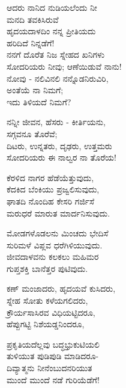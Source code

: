 \begin{myquote}
ಆದರು ನಾನಿದ ನುಡಿಯಲೆಂದು ನೀ\\ಮನದಿ ತವಕಿಸಿರುವೆ\\ಹೃದಯದಾಳದಿಂ ನನ್ನ ಪ್ರೀತಿಯದು\\ಹರಿದಿದೆ ನಿನ್ನಡೆಗೆ!\\ನನಗೆ ದೊರೆತ ನಿಜ ಸ್ನೇಹದ ಖನಿಗಳು\\ಸೋದರಿಯರು ನೀವು; ಆಣೆಯಿಡುವೆ ನಾನು!\\ನೋವು - ನಲಿವಿನಲಿ ನನ್ನೊಡನಿರುವಿರಿ,\\ಅಂತೆಯೆ ನಾ ನಿಮಗೆ;\\ಇದು ತಿಳಿಯದೆ ನಿಮಗೆ?
\end{myquote}

\begin{myquote}
ನನ್ನೀ ಜೀವನ, ಹೆಸರು - ಕೀರ್ತಿಯನು,\\ಸಗ್ಗವನೂ ತೊರೆವೆ;\\ದಿಟರು, ಉನ್ನತರು, ದೃಢರು, ಉತ್ತಮರು\\ಸೋದರಿಯರು ಈ ನಾಲ್ವರ ನಾ ತೊರೆಯ!
\end{myquote}

\begin{myquote}
ಕೆರಳಿದ ನಾಗರ ಹೆಡೆಯೆತ್ತುವುದು,\\ಕೆದಕಿದ ಬೆಂಕಿಯು ಪ್ರಜ್ವಲಿಸುವುದು,\\ಘಾತದಿ ನೊಂದಿಹ ಕೇಸರಿ ಗರ್ಜಿಸೆ\\ಮರುಧರೆ ಮಾರುತ ಮಾರ್ದನಿಸುವುದು.
\end{myquote}

\begin{myquote}
ಮೋಡಗಳೊಡಲನು ಮಿಂಚದು ಭೇದಿಸೆ\\ಸುರಿಮಳೆ ವಿಪ್ಲವ ಧರೆಗಿಳಿಯುವುದು.\\ಜೀವದಾಳವನು ಕಲಕಲು ಮಹಿಮರ\\ಗುಪ್ತಶಕ್ತಿ ಬಾನೆತ್ತರ ಪುಟಿವುದು.
\end{myquote}

\begin{myquote}
ಕಣ್ ಮಂಜಾದರು, ಹೃದಯವೆ ಕುಸಿದರು,\\ಸ್ನೇಹ ಸೋತು ಕಳೆಯಗಲಿದರು,\\ಕ್ರೌರ್ಯಸಾಸಿರವ ವಿಧಿಯಟ್ಟಿದರೂ,\\ಹೆಪ್ಪುಗಟ್ಟಿ ನಿಶೆಯಡ್ಡನಿಂದರೂ,
\end{myquote}

\begin{myquote}
ಪ್ರಕೃತಿಯದೆಲ್ಲವು ಬದ್ಧಭ್ರುಕುಟಿಯಲಿ\\ತುಳಿಯುತ ಪುಡಿಪುಡಿ ಮಾಡಿದರೂ-\\ದಿವ್ಯಾತ್ಮನು ನೀನೆಂಬುದನರಿಯುತ\\ಮುಂದೆ ಮುಂದೆ ನಡೆ ಗುರಿಯೆಡೆಗೆ!
\end{myquote}

